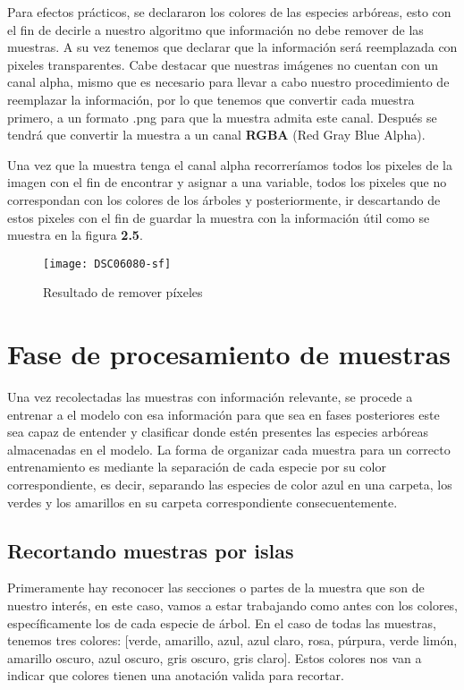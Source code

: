Para efectos prácticos, se declararon los colores de las especies arbóreas, esto con el fin de decirle a nuestro algoritmo que información no debe remover de las muestras. A su vez tenemos que declarar que la información será reemplazada con pixeles transparentes. Cabe destacar que nuestras imágenes no cuentan con un canal alpha, mismo que es necesario para llevar a cabo nuestro procedimiento de reemplazar la información, por lo que tenemos que convertir cada muestra primero, a un formato .png para que la muestra admita este canal. Después se tendrá que convertir la muestra a un canal \textbf{RGBA} (Red Gray Blue Alpha).

 Una vez que la muestra tenga el canal alpha recorreríamos todos los pixeles de la imagen con el fin de encontrar y asignar a una variable, todos los pixeles que no correspondan con los colores de los árboles y posteriormente, ir descartando de estos pixeles con el fin de guardar la muestra con la información útil como se muestra en la figura \textbf{2.5}.

\begin{figure} [!b]
	\centering
	\begin{minipage}[b]{0.5\textwidth}
		\texttt{[image: DSC06080-sf]}
		\caption{Resultado de remover píxeles}
	\end{minipage}
\end{figure}

\break

\section{Fase de procesamiento de muestras}
Una vez recolectadas las muestras con información relevante, se procede a  entrenar a el modelo con esa información para que sea en fases posteriores este sea capaz de entender y clasificar donde estén presentes las especies arbóreas almacenadas en el modelo. La forma de organizar cada muestra para un correcto entrenamiento es mediante la separación de cada especie por su color correspondiente, es decir, separando las especies de color azul en una carpeta, los verdes y los amarillos en su carpeta correspondiente consecuentemente.

\subsection{Recortando muestras por islas}
Primeramente hay reconocer las secciones o partes de la muestra que son de nuestro interés, en este caso, vamos a estar trabajando como antes con los colores, específicamente los de cada especie de árbol. En el caso de todas las muestras, tenemos tres colores: [verde, amarillo, azul, azul claro, rosa, púrpura, verde limón, amarillo oscuro, azul oscuro, gris oscuro, gris claro]. Estos colores nos van a indicar que colores tienen una anotación valida para recortar.


